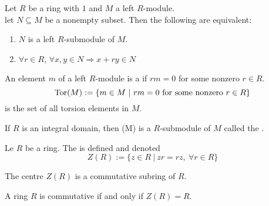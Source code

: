 \begin{proposition}
Let $R$ be a ring with $1$ and $M$ a left $R$-module.\\
let $N \subseteq M$ be a nonempty subset. Then the following are equivalent:
\begin{enumerate}[label=(\roman*)]
\item $N$ is a left $R$-submodule of $M$.
\item $\forall r \in R$, $\forall x, y \in N \Rightarrow x+ry \in N$	
\end{enumerate}
\end{proposition}

\begin{definition}
An element $m$ of a left $R$-module is a  if $rm=0$ for some nonzero $r \in R$.
\begin{equation}
\textnormal{Tor}(M) := \{m \in M \ | \ rm=0 \textnormal{ for some nonzero } r \in R\} \nonumber
\end{equation}
is the set of all torsion elements in $M$.
\end{definition}

\begin{proposition}
If $R$ is an integral domain, then \tors(M) is a $R$-submodule of $M$ called the .
\end{proposition}

\begin{definition}
Le $R$ be a ring. The  is defined and denoted
\begin{equation}
Z(R) := \{z \in R \ | \ zr = rz, \ \forall r \in R\} \nonumber
\end{equation}
\end{definition}

\begin{remark}
The centre $Z(R)$ is a commutative subring of $R$.
\end{remark}

\begin{remark}
A ring $R$ is commutative if and only if $Z(R) = R$.
\end{remark}

